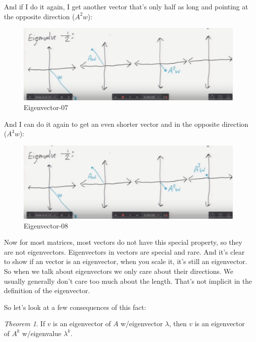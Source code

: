 \documentclass[fleqn,10pt]{olplainarticle}
\theoremstyle{definition}
\theoremstyle{remark}
\newtheorem{theorem}{Theorem}
\begin{document}
And if I do it again, I get another vector that's only half as long and pointing at the opposite direction ($A^2w$):

\begin{figure}[ht]
\centering
\includegraphics[width=1.0\linewidth]{images/chpt08-07}
\caption{Eigenvector-07}
\label{fig:chpt08-07}
\end{figure}
\clearpage

And I can do it again to get an even shorter vector and in the opposite direction ($A^3w$):

\begin{figure}[ht]
\centering
\includegraphics[width=1.0\linewidth]{images/chpt08-08}
\caption{Eigenvector-08}
\label{fig:chpt08-08}
\end{figure}

Now for most matrices, most vectors do not have this special property, so they are not eigenvectors. Eigenvectors in vectors are special and rare. And it's clear to show if an vector is an eigenvector, when you scale it, it's still an eigenvector. So when we talk about eigenvectors we only care about their directions. We usually generally don't care too much about the length. That's not implicit in the definition of the eigenvector.

So let's look at a few consequences of this fact:\medskip

\begin{theorem}
If $v$ is an eigenvector of $A$ w/eigenvector $\lambda$, then $v$ is an eigenvector of $A^k$ w/eigenvalue $\lambda^k$.
\end{theorem}
\end{document}
